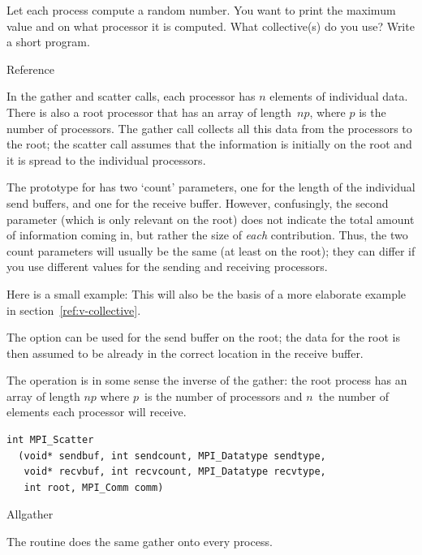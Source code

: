 \begin{exercise}
  \label{ex:randomwhere}
  Let each process compute a random number.
  You want to print the maximum value and on what processor it
  is computed. What collective(s) do you use? Write a short program.
\end{exercise}

 {Reference}

In the gather and scatter calls, each processor has $n$ elements of individual
data. There is also a root processor that has an array of length~$np$, where $p$
is the number of processors. The gather call collects all this data from the 
processors to the root; the scatter call assumes that the information is 
initially on the root and it is spread to the individual processors.

The prototype for  has two `count' parameters, one
for the length of the individual send buffers, and one for the receive buffer.
However, confusingly, the second parameter (which is only relevant on the root)
does not indicate the total amount of information coming in, but
rather the size of \emph{each} contribution. Thus, the two count parameters
will usually be the same (at least on the root); they can differ if you 
use different  values for the sending and receiving
processors.


Here is a small example:
This will also be the basis of a more elaborate example in
section~\ref{ref:v-collective}.

The  option can be used for the send buffer on the root;
the data for the root is then assumed to be already in the correct location
in the receive buffer.

The  operation is in some sense the inverse of the gather:
the root process has an array of length $np$ where $p$~is the number of processors
and $n$~the number of elements each processor will receive.
\begin{lstlisting}
int MPI_Scatter
  (void* sendbuf, int sendcount, MPI_Datatype sendtype, 
   void* recvbuf, int recvcount, MPI_Datatype recvtype, 
   int root, MPI_Comm comm) 
\end{lstlisting}

 {Allgather}

The  routine does the same gather onto
every process.
%

